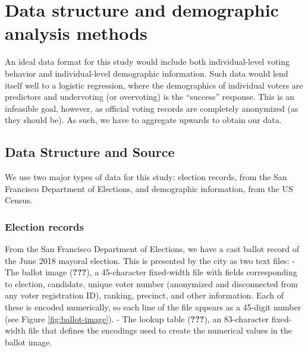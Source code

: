 \documentclass[12pt,twoside]{reedthesis}
\begin{document}
\hypertarget{demo-methods}{%
\chapter{Data structure and demographic analysis methods}\label{demo-methods}}

An ideal data format for this study would include both individual-level voting behavior and individual-level demographic information. Such data would lend itself well to a logistic regression, where the demographics of individual voters are predictors and undervoting (or overvoting) is the ``success'' response. This is an infeasible goal, however, as official voting records are completely anonymized (as they should be). As such, we have to aggregate upwards to obtain our data.

\hypertarget{data-structure-and-source}{%
\section{Data Structure and Source}\label{data-structure-and-source}}

We use two major types of data for this study: election records, from the San Francisco Department of Elections, and demographic information, from the US Census.

\hypertarget{election-records}{%
\subsection{Election records}\label{election-records}}

From the San Francisco Department of Elections, we have a cast ballot record of the June 2018 mayoral election. This is presented by the city as two text files:
- The ballot image ({\textbf{???}}), a 45-character fixed-width file with fields corresponding to election, candidate, unique voter number (anonymized and disconnected from any voter registration ID), ranking, precinct, and other information. Each of these is encoded numerically, so each line of the file appears as a 45-digit number (see Figure \ref{fig:ballot-image}).
- The lookup table ({\textbf{???}}), an 83-character fixed-width file that defines the encodings used to create the numerical values in the ballot image.
\end{document}
